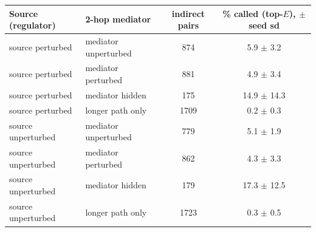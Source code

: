 \begin{tabular}{llcc}
\toprule
Source (regulator) & 2-hop mediator & indirect pairs & \% called (top-$E$), $\pm$ seed sd \\
\midrule
source perturbed & mediator unperturbed & 874 & 5.9 $\pm$ 3.2 \\
source perturbed & mediator perturbed & 881 & 4.9 $\pm$ 3.4 \\
source perturbed & mediator hidden & 175 & 14.9 $\pm$ 14.3 \\
source perturbed & longer path only & 1709 & 0.2 $\pm$ 0.3 \\
source unperturbed & mediator unperturbed & 779 & 5.1 $\pm$ 1.9 \\
source unperturbed & mediator perturbed & 862 & 4.3 $\pm$ 3.3 \\
source unperturbed & mediator hidden & 179 & 17.3 $\pm$ 12.5 \\
source unperturbed & longer path only & 1723 & 0.3 $\pm$ 0.5 \\
\bottomrule
\end{tabular}